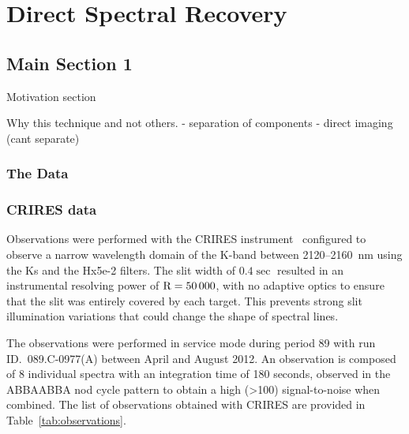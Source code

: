 

\chapter{Direct Spectral Recovery}  %
\label{cha:direct_recovery} 

\section{Main Section 1}

Motivation section

Why this technique and not  others.
- separation of components
- direct imaging (cant separate)

\subsection{The Data}

\subsection{CRIRES data}
\label{subsec:CRIRES} 
Observations were performed with the CRIRES instrument~\citep{kaeufl_crires_2004} configured to observe a narrow wavelength domain of the K-band between 2120--2160~nm using the Ks and the Hx5e-2 filters. The slit width of \(0.4\sec\) resulted in an instrumental resolving power of \(\rm R=50\,000\), with no adaptive optics to ensure that the slit was entirely covered by each target. This prevents strong slit illumination variations that could change the shape of spectral lines.

The observations were performed in service mode during period 89 with run ID.~089.C-0977(A) between April and August 2012. An observation is composed of 8 individual spectra with an integration time of 180 seconds, observed in the ABBAABBA nod cycle pattern to obtain a high (>100) signal-to-noise when combined. The list of observations obtained with CRIRES are provided in Table~\ref{tab:observations}.

